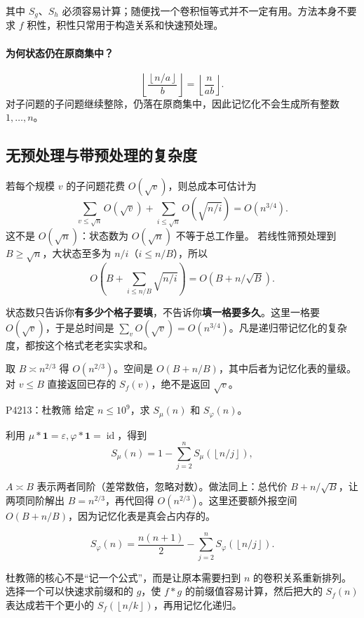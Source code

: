 \documentclass[UTF8,a4paper,11pt,twoside,openright,fontset=fandol]{ctexbook}
\theoremstyle{definition}
\newcommand{\eps}{\varepsilon}
\newcommand{\one}{\mathbf 1}
\newcommand{\id}{\operatorname{id}}
\newcommand{\floor}[1]{\left\lfloor #1\right\rfloor}
\begin{document}
其中 $S_g$、$S_h$ 必须容易计算；随便找一个卷积恒等式并不一定有用。方法本身不要求 $f$ 积性，积性只常用于构造关系和快速预处理。

\paragraph{为何状态仍在原商集中？}
\[
\floor{\frac{\floor{n/a}}b}=\floor{\frac n{ab}}.
\]
对子问题的子问题继续整除，仍落在原商集中，因此记忆化不会生成所有整数 $1,\ldots,n$。

\subsection{无预处理与带预处理的复杂度}
若每个规模 $v$ 的子问题花费 $O(\sqrt v)$，则总成本可估计为
\[
 \sum_{v\le\sqrt n}O(\sqrt v)
 +\sum_{i\le\sqrt n}O(\sqrt{n/i})=O(n^{3/4}).
\]
这不是 $O(\sqrt n)$：状态数为 $O(\sqrt n)$ 不等于总工作量。
若线性筛预处理到 $B\ge\sqrt n$，大状态至多为 $n/i$（$i\le n/B$），所以
\[
 O\left(B+\sum_{i\le n/B}\sqrt{n/i}\right)
 =O(B+n/\sqrt B).
\]

\begin{tip}
状态数只告诉你\textbf{有多少个格子要填}，不告诉你\textbf{填一格要多久}。这里一格要 $O(\sqrt v)$，于是总时间是 $\sum_{v}O(\sqrt v)=O(n^{3/4})$。凡是递归带记忆化的复杂度，都按这个格式老老实实求和。
\end{tip}

取 $B\asymp n^{2/3}$ 得 $O(n^{2/3})$。空间是 $O(B+n/B)$，其中后者为记忆化表的量级。对 $v\le B$ 直接返回已存的 $S_f(v)$，绝不是返回 $\sqrt v$。


\begin{problem}{P4213：杜教筛}
给定 $n\le10^9$，求 $S_\mu(n)$ 和 $S_\varphi(n)$。
\end{problem}
利用 $\mu*\one=\eps,\varphi*\one=\id$，得到
\[
 S_\mu(n)=1-\sum_{j=2}^n S_\mu(\floor{n/j}),
\]

\begin{tip}
$A\asymp B$ 表示两者同阶（差常数倍，忽略对数）。做法同上：总代价 $B+n/\sqrt B$，让两项同阶解出 $B=n^{2/3}$，再代回得 $O(n^{2/3})$。这里还要额外报空间 $O(B+n/B)$，因为记忆化表是真会占内存的。
\end{tip}

\[
 S_\varphi(n)=\frac{n(n+1)}2-\sum_{j=2}^nS_\varphi(\floor{n/j}).
\]

\begin{pitfall}[讲解：先看这题到底在做什么]
杜教筛的核心不是“记一个公式”，而是让原本需要扫到 $n$ 的卷积关系重新排列。选择一个可以快速求前缀和的 $g$，使 $f*g$ 的前缀值容易计算，然后把大的 $S_f(n)$ 表达成若干个更小的 $S_f(\floor{n/k})$，再用记忆化递归。
\end{pitfall}
\end{document}
